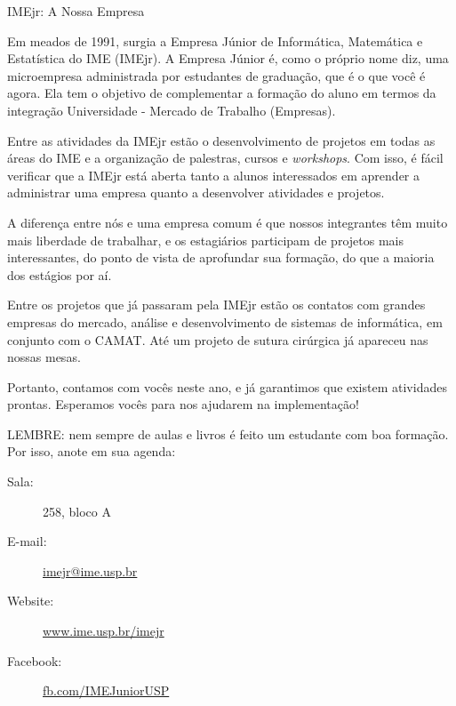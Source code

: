 \begin{subsecao}{IMEjr: A Nossa Empresa}

Em meados de 1991, surgia a Empresa Júnior de Informática, Matemática
e Estatística do IME (IMEjr). A Empresa Júnior é, como o próprio nome
diz, uma microempresa administrada por estudantes de graduação, que é
o que você é agora. Ela tem o objetivo de complementar a formação do
aluno em termos da integração Universidade - Mercado de Trabalho
(Empresas).

Entre as atividades da IMEjr estão o desenvolvimento de
projetos em todas as áreas do IME e a organização de palestras, cursos
e \textit{workshops}. Com isso, é fácil verificar que a IMEjr está aberta tanto
a alunos interessados em aprender a administrar uma empresa quanto a
desenvolver atividades e projetos.

A diferença entre nós e uma
empresa comum é que nossos integrantes têm muito mais liberdade de
trabalhar, e os estagiários participam de projetos mais interessantes,
do ponto de vista de aprofundar sua formação, do que a maioria dos
estágios por aí.

Entre os projetos que já passaram pela IMEjr estão
os contatos com grandes empresas do mercado, análise e desenvolvimento
de sistemas de informática, em conjunto com o CAMAT. Até um projeto
de sutura cirúrgica já apareceu nas nossas mesas.

Portanto, contamos
com vocês neste ano, e já garantimos que existem atividades
prontas. Esperamos vocês para nos ajudarem na implementação!

LEMBRE: nem sempre de aulas e livros é feito um estudante com boa
formação. Por isso, anote em sua agenda: 
\begin{description}
\item [Sala:] 258, bloco A
\item[E-mail:] \url{imejr@ime.usp.br}
\item[Website:] \url{www.ime.usp.br/imejr}
\item[Facebook:] \url{fb.com/IMEJuniorUSP}
\end{description}

\end{subsecao}
